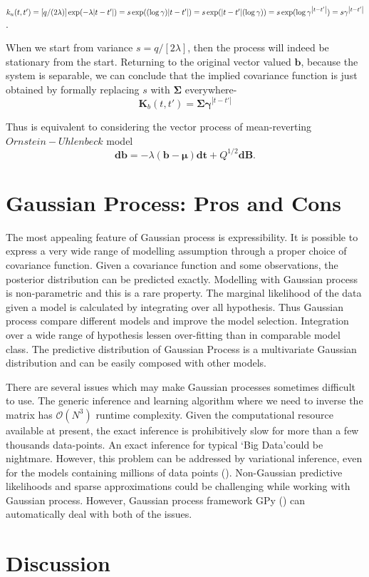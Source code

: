 $k_u(t,t')
  = [q / (2 \lambda)] \exp(-\lambda {\left|t-t'\right|})\\
  = s \exp((\log \gamma) {\left|t-t'\right|})\\
  = s \exp({\left|t-t'\right|}(\log \gamma))\\
  = s \exp(\log \gamma^{\left|t-t'\right|})\\
  = s \gamma^{\left|t-t'\right|}$.

When we start from variance $s = q / \left[2 \lambda\right]$, then the process will indeed be stationary from the start. Returning to the original vector valued $\textbf{b}$, because the system is separable, we can conclude that the implied covariance function is just obtained by formally replacing $s$ with $\boldsymbol{\Sigma}$ everywhere- 
\begin{equation}
\textbf{K}_b(t,t') = \boldsymbol{\Sigma} \boldsymbol{\gamma}^{\left|t-t'\right|}
\end{equation}

Thus is equivalent to considering the vector process of mean-reverting $Ornstein-Uhlenbeck$ model
\begin{equation}
\textbf{db} = -\lambda (\textbf{b} - \boldsymbol{\mu}) \textbf{dt} + Q^{1/2} \textbf{dB}.
\end{equation}

\section{Gaussian Process: Pros and Cons}
The most appealing feature of Gaussian process is expressibility. It is possible to express a very wide range of modelling assumption through a proper choice of covariance function. Given a covariance function and some observations, the posterior distribution can be predicted exactly. Modelling with Gaussian process is non-parametric and this is a rare property. The marginal likelihood of the data given a model is calculated by integrating over all hypothesis. Thus Gaussian process compare different models and improve the model selection. Integration over a wide range of hypothesis lessen over-fitting than in comparable model class. The predictive distribution of Gaussian Process is a multivariate Gaussian distribution and can be easily composed with other models.

There are several issues which may make Gaussian processes sometimes difficult to use. The generic inference and learning algorithm where we need to inverse the matrix has $\mathcal{O}\left(N^3\right)$ runtime complexity. Given the computational resource available at present, the exact inference is prohibitively slow for more than a few thousands data-points. An exact inference for typical \lq Big Data\rq  could be nightmare. However, this problem can be addressed by variational inference, even for the models containing millions of data points (\cite{Hensman:2013a}). Non-Gaussian predictive likelihoods and sparse approximations could be challenging while working with Gaussian process. However, Gaussian process framework GPy (\cite{gpy2014}) can automatically deal with both of the issues. 

\section{Discussion}
